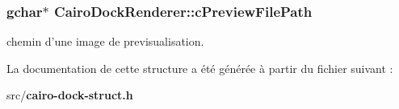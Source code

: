 \subsubsection{\setlength{\rightskip}{0pt plus 5cm}gchar$\ast$ {\bf CairoDockRenderer::cPreviewFilePath}}\label{structCairoDockRenderer_8bde9029add1ce9d73a6af97d55abf39}


chemin d'une image de previsualisation. 



La documentation de cette structure a été générée à partir du fichier suivant :\begin{CompactItemize}
\item 
src/{\bf cairo-dock-struct.h}\end{CompactItemize}
